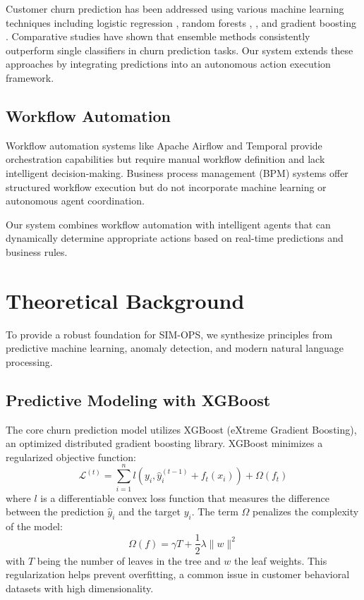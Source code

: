 \documentclass[conference]{IEEEtran}
\begin{document}
Customer churn prediction has been addressed using various machine learning techniques including logistic regression \cite{verbeke2012new}, random forests \cite{xie2009customer}, \cite{breiman2001random}, and gradient boosting \cite{chen2016xgboost}. Comparative studies \cite{vafeiadis2015comparison} have shown that ensemble methods consistently outperform single classifiers in churn prediction tasks. Our system extends these approaches by integrating predictions into an autonomous action execution framework.

\subsection{Workflow Automation}
Workflow automation systems like Apache Airflow \cite{airflow2015} and Temporal \cite{temporal2019} provide orchestration capabilities but require manual workflow definition and lack intelligent decision-making. Business process management (BPM) systems \cite{dumas2018fundamentals} offer structured workflow execution but do not incorporate machine learning or autonomous agent coordination.

Our system combines workflow automation with intelligent agents that can dynamically determine appropriate actions based on real-time predictions and business rules.

\section{Theoretical Background}

To provide a robust foundation for SIM-OPS, we synthesize principles from predictive machine learning, anomaly detection, and modern natural language processing. 

\subsection{Predictive Modeling with XGBoost}
The core churn prediction model utilizes XGBoost (eXtreme Gradient Boosting), an optimized distributed gradient boosting library. XGBoost minimizes a regularized objective function:
\begin{equation}
\mathcal{L}^{(t)} = \sum_{i=1}^n l(y_i, \hat{y}_i^{(t-1)} + f_t(x_i)) + \Omega(f_t)
\end{equation}
where $l$ is a differentiable convex loss function that measures the difference between the prediction $\hat{y}_i$ and the target $y_i$. The term $\Omega$ penalizes the complexity of the model:
\begin{equation}
\Omega(f) = \gamma T + \frac{1}{2}\lambda \|w\|^2
\end{equation}
with $T$ being the number of leaves in the tree and $w$ the leaf weights. This regularization helps prevent overfitting, a common issue in customer behavioral datasets with high dimensionality.
\end{document}
